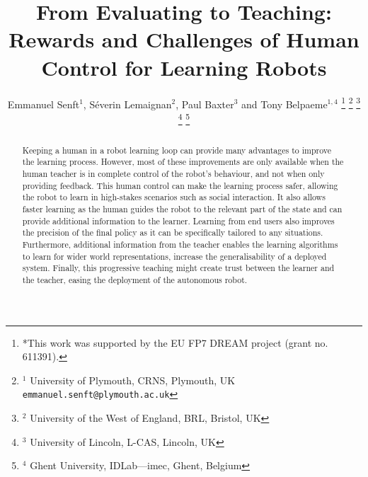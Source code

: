 \documentclass[letterpaper, 10 pt, conference]{ieeeconf}  %
\title{\LARGE \bf
From Evaluating to Teaching:\\
Rewards and Challenges of Human Control for Learning Robots
}
\author{Emmanuel Senft$^{1}$, S\'{e}verin Lemaignan$^{2}$, Paul Baxter$^{3}$ and Tony Belpaeme$^{1,4}$%
\thanks{*This work was supported by the EU FP7 DREAM project (grant no.  611391).}%
\thanks{$^{1}$ University of Plymouth, CRNS, Plymouth, UK\newline
        {\tt\small emmanuel.senft@plymouth.ac.uk}}%
\thanks{$^{2}$ University of the West of England, BRL, Bristol, UK}%
\thanks{$^{3}$ University of Lincoln, L-CAS, Lincoln, UK}%
\thanks{$^{4}$ Ghent University, IDLab—imec, Ghent, Belgium}%
}
\begin{document}
\maketitle
\thispagestyle{empty}
\pagestyle{empty}


\begin{abstract}
Keeping a human in a robot learning loop can provide many advantages to improve the learning process. However, most of these improvements are only available when the human teacher is in complete control of the robot's behaviour, and not when only providing feedback.
This human control can make the learning process safer, allowing the robot to learn in high-stakes scenarios such as social interaction. It also allows faster learning as the human guides the robot to the relevant part of the state and can provide additional information to the learner. Learning from end users also improves the precision of the final policy as it can be specifically tailored to any situations. Furthermore, additional information from the teacher enables the learning algorithms to learn for wider world representations, increase the generalisability of a deployed system. %
Finally, this progressive teaching might create trust between the learner and the teacher, easing the deployment of the autonomous robot. %

\end{abstract}
\end{document}
